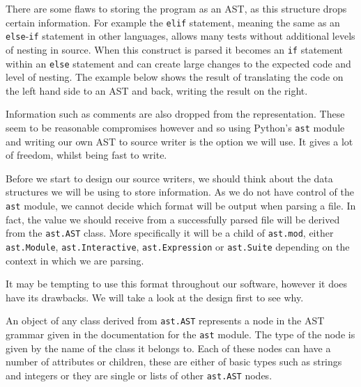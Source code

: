 \documentclass[twoside,a4paper]{report}
\begin{document}
There are some flaws to storing the program as an AST, as this structure drops certain information.
For example the \texttt{elif} statement, meaning the same as an \texttt{else}-\texttt{if} statement in other languages, allows many tests without
additional levels of nesting in source. When this construct is parsed it becomes an \texttt{if} statement within an \texttt{else} statement and
can create large changes to the expected code and level of nesting. The example below shows the result of translating the code on the left hand
side to an AST and back, writing the result on the right.

\begin{minipage}[b]{0.4\linewidth}
\centering

\end{minipage}
\hspace{1cm}
\begin{minipage}[b]{0.5\linewidth}
\centering

\end{minipage}

Information such as comments are also dropped from the representation. These seem to be reasonable compromises however and so
using Python's \texttt{ast} module and writing our own AST to source writer is the option we will use. It gives a lot of freedom, whilst
being fast to write.

Before we start to design our source writers, we should think about the data structures we will be using to store information. As we do not have
control of the \texttt{ast} module, we cannot decide which format will be output when parsing a file. In fact, the value we should receive from
a successfully parsed file will be derived from the \texttt{ast.AST} class. More specifically it will be a child of \texttt{ast.mod}, either
\texttt{ast.Module}, \texttt{ast.Interactive}, \texttt{ast.Expression} or \texttt{ast.Suite} depending on the context in which we are parsing.

It may be tempting to use this format throughout our software, however it does have its drawbacks. We will take a look at the design first to see why.

An object of any class derived from \texttt{ast.AST} represents a node in the AST grammar given in the documentation for the \texttt{ast} module. The
type of the node is given by the name of the class it belongs to. Each of these nodes can have a number of attributes or children, these are either of basic
types such as strings and integers or they are single or lists of other \texttt{ast.AST} nodes.
\end{document}
